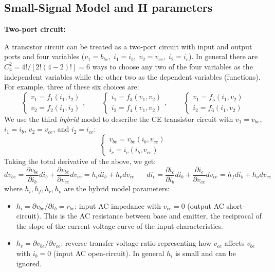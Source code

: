 \begin{itemize}
\section*{Small-Signal Model and H parameters}

{\bf Two-port circuit:} 


A transistor circuit can be treated as a two-port circuit with input 
and output ports and four variables ($v_1=b_{be},\;i_1=i_b,\;v_2=v_{ce},
\;i_2=i_c$). In general there are $C_4^2=4!/[2!(4-2)!]=6$ ways to choose
any two of the four variables as the independent variables while the 
other two as the dependent variables (functions). For example, three 
of these six choices are:
\[
\left\{ \begin{array}{l} v_1=f_1(i_1,i_2) \\ v_2=f_2(i_1,i_2)
\end{array} \right.,
\;\;\;\;\;\;\;\;
\left\{ \begin{array}{l} i_1=f_3(v_1,v_2) \\ i_2=f_4(v_1,v_2)
\end{array} \right.,
\;\;\;\;\;\;\;\;
\left\{ \begin{array}{l} v_1=f_5(i_1,v_2) \\ i_2=f_6(i_1,v_2)
\end{array} \right.
\]
We use the third {\em hybrid} model to describe the CE transistor circuit 
with $v_1=v_{be}$, $i_1=i_b$, $v_2=v_{ce}$, and $i_2=i_{ce}$:
\[
\left\{ \begin{array}{l} v_{be}=v_{be}(i_b,v_{ce}) \\ i_c=i_c(i_b,v_{ce})
\end{array} \right.
\]
Taking the total derivative of the above, we get:
\[
dv_{be}=\frac{\partial v_{be}}{\partial i_b} d i_b
+\frac{\partial v_{be}}{\partial v_{ce}} d v_{ce} 
=h_i d i_b+h_r d v_{ce}	
\;\;\;\;\;\;
di_c=\frac{\partial i_c}{\partial i_b} d i_b
+\frac{\partial i_c}{\partial v_{ce}} d v_{ce} 
=h_f d i_b+h_o d v_{ce}
\]
where $h_i, h_f, h_r, h_o$ are the hybrid model parameters:
\begin{itemize}
\item $h_i=\partial v_{be}/\partial i_b=r_{be}$: input AC impedance
  with $v_{ce}=0$ (output AC short-circuit). This is the AC 
  resistance between base and emitter, the reciprocal of the 
  slope of the current-voltage curve of the input characteristics. 

\item $h_r=\partial v_{be}/\partial v_{ce}$: reverse transfer voltage
  ratio representing how $v_{ce}$ affects $v_{be}$ with $i_b=0$ (input 
  AC open-circuit). In general $h_i$ is small and can be ignored.


\end{itemize}
\end{itemize}
